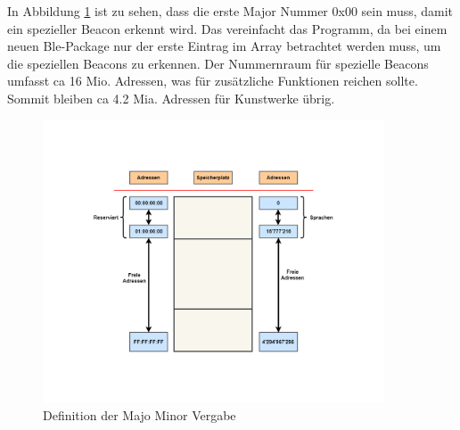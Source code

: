In Abbildung \ref{fig:Bluetooth_MM_Vergabe} ist zu sehen, dass die erste Major Nummer 0x00 sein muss, damit ein spezieller Beacon erkennt wird. Das vereinfacht das Programm, da bei einem neuen Ble-Package nur der erste Eintrag im Array betrachtet werden muss, um die speziellen Beacons zu erkennen. Der Nummernraum für spezielle Beacons umfasst ca 16 Mio. Adressen, was für zusätzliche Funktionen reichen sollte. Sommit bleiben ca 4.2 Mia. Adressen für Kunstwerke übrig.

\begin{figure}[htbp!!!!]
	\centering
	\includegraphics[width=0.9\textwidth]{Data/Speicheradressen_picture.png}
	\caption[Software:MM Vergabe]{Definition der Majo Minor Vergabe}
	\label{fig:Bluetooth_MM_Vergabe}
\end{figure}



